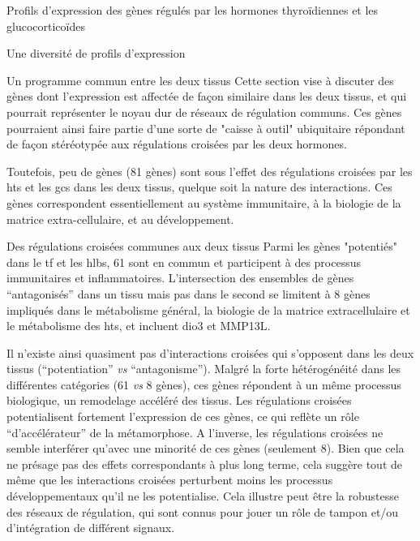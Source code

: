 \documentclass[../main.tex]{subfiles}
\begin{document}
\begin{chapter}{Profils d'expression des gènes régulés par les hormones thyroïdiennes et les glucocorticoïdes}
\begin{section}{Une diversité de profils d'expression}
\begin{subsection}{Un programme commun entre les deux tissus}
Cette section vise à discuter des gènes dont l'expression est affectée de façon similaire dans les deux tissus, et qui pourrait représenter le noyau dur de réseaux de régulation communs.
Ces gènes pourraient ainsi faire partie d'une sorte de "caisse à outil" ubiquitaire répondant de façon stéréotypée aux régulations croisées par les deux hormones.
\par
Toutefois, peu de gènes (81 gènes) sont sous l'effet des régulations croisées par les \glspl{ht} et les \glspl{gc} dans les deux tissus, quelque soit la nature des interactions.
Ces gènes correspondent essentiellement au système immunitaire, à la biologie de la matrice extra-cellulaire, et au développement.

\begin{subsubsection}{Des régulations croisées communes aux deux tissus}
Parmi les gènes "potentiés" dans le \gls{tf} et les \glspl{hlb}, 61 sont en commun et participent à des processus immunitaires et inflammatoires.
L'intersection des ensembles de gènes ``antagonisés'' dans un tissu mais pas dans le second se limitent à 8 gènes impliqués dans le métabolisme général, la biologie de la matrice extracellulaire et le métabolisme des \glspl{ht}, et incluent \gls{dio3} et MMP13L.
\par
Il n'existe ainsi quasiment pas d'interactions croisées qui s'opposent dans les deux tissus (``potentiation'' \textit{vs} ``antagonisme'').
Malgré la forte hétérogénéité dans les différentes catégories (61 \textit{vs} 8 gènes), ces gènes répondent à un même processus biologique, un remodelage accéléré des tissus.
Les régulations croisées potentialisent fortement l'expression de ces gènes, ce qui reflète un rôle ``d'accélérateur'' de la métamorphose.
A l'inverse, les régulations croisées ne semble interférer qu'avec une minorité de ces gènes (seulement 8).
Bien que cela ne présage pas des effets correspondants à plus long terme, cela suggère tout de même que les interactions croisées perturbent moins les processus développementaux qu'il ne les potentialise.
Cela illustre peut être la robustesse des réseaux de régulation, qui sont connus pour jouer un rôle de tampon et/ou d'intégration de différent signaux.
\end{subsubsection}


\end{subsection}
\end{section}
\end{chapter}
\end{document}
